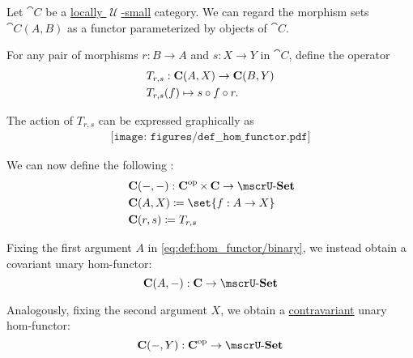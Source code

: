 \begin{definition}\label{def:hom_functor}
  Let \( \cat{C} \) be a \hyperref[def:category_size]{locally \( \mscrU \)-small} category. We can regard the morphism sets \( \cat{C}(A, B) \) as a functor parameterized by objects of \( \cat{C} \).

  \begin{thmenum}
     For any pair of morphisms \( r: B \to A \) and \( s: X \to Y \) in \( \cat{C} \), define the operator
    \begin{equation}\label{eq:def:hom_functor/t}
      \begin{aligned}
        &T_{r,s}: \cat{C}(A, X) \to \cat{C}(B, Y) \\
        &T_{r,s}(f) \mapsto s \bincirc f \bincirc r.
      \end{aligned}
    \end{equation}

    The action of \( T_{r,s} \) can be expressed graphically as
    \begin{equation}\label{eq:def:hom_functor/t_diagram}
      \begin{aligned}
        \texttt{[image: figures/def\_\_hom\_functor.pdf]}
      \end{aligned}
    \end{equation}

    We can now define the following :
    \begin{equation}\label{eq:def:hom_functor/binary}
      \begin{aligned}
        &\cat{C}(\anon*, \anon*): \cat{C}^{\opcat} \times \cat{C} \to \ucat{Set} \\
        &\cat{C}(A, X) \coloneqq \set{ f: A \to X } \\
        &\cat{C}(r, s) \coloneqq T_{r,s}
      \end{aligned}
    \end{equation}

     Fixing the first argument \( A \) in \eqref{eq:def:hom_functor/binary}, we instead obtain a covariant unary hom-functor:
    \begin{equation}\label{eq:def:hom_functor/unary/covariant}
      \cat{C}(A, \anon*): \cat{C} \to \ucat{Set}
    \end{equation}

    Analogously, fixing the second argument \( X \), we obtain a \hyperref[def:hom_functor/contravariant]{contravariant} unary hom-functor:
    \begin{equation}\label{eq:def:hom_functor/unary/contravariant}
      \cat{C}(\anon*, Y): \cat{C}^{\opcat} \to \ucat{Set}
    \end{equation}
  \end{thmenum}
\end{definition}
